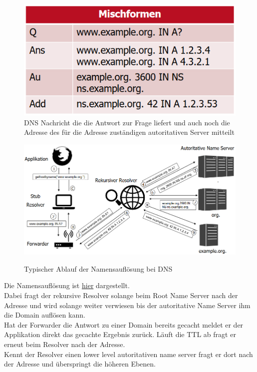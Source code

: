 \documentclass[a4paper,12pt,leqno]{article}
\begin{document}
\begin{figure}
\centering
\includegraphics[scale=0.7]{Grafiken/DNS-Nachricht.png}
\caption{DNS Nachricht die die Antwort zur Frage liefert und auch noch die Adresse des für die Adresse zuständigen autoritativen Server mitteilt}
\end{figure} 

\begin{figure}[h!]
\centering
\includegraphics[scale=0.6]{Grafiken/DNS-Namensaufloesung.png}
\label{pic:DNS-Namensaufloesung}
\caption{Typischer Ablauf der Namensauflösung bei DNS}
\end{figure}

Die Namensauflösung ist \hyperref[pic:DNS-Namensaufloesung]{hier} dargestellt.\\
Dabei fragt der rekursive Resolver solange beim Root Name Server nach der Adresse und wird solange weiter verwiesen bis der autoritative Name Server ihm die Domain auflösen kann.\\
Hat der Forwarder die Antwort zu einer Domain bereits gecacht meldet er der Applikation direkt das gecachte Ergebnis zurück. Läuft die TTL ab fragt er erneut beim Resolver nach der Adresse.\\
Kennt der Resolver einen lower level autoritativen name server fragt er dort nach der Adresse und überspringt die höheren Ebenen.\\
\end{document}
